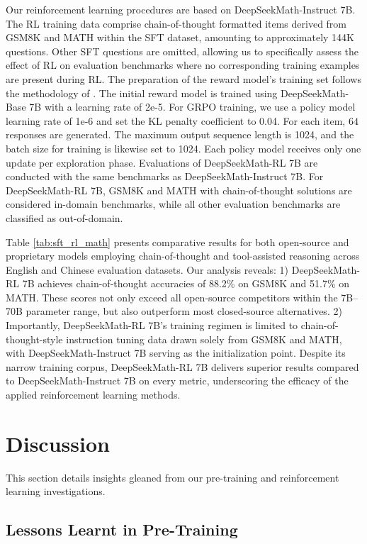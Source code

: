 Our reinforcement learning procedures are based on DeepSeekMath-Instruct 7B. The RL training data comprise chain-of-thought formatted items derived from GSM8K and MATH within the SFT dataset, amounting to approximately 144K questions. Other SFT questions are omitted, allowing us to specifically assess the effect of RL on evaluation benchmarks where no corresponding training examples are present during RL. The preparation of the reward model’s training set follows the methodology of \citep{wang2023math}. The initial reward model is trained using DeepSeekMath-Base 7B with a learning rate of 2e-5. For GRPO training, we use a policy model learning rate of 1e-6 and set the KL penalty coefficient to 0.04. For each item, $64$ responses are generated. The maximum output sequence length is 1024, and the batch size for training is likewise set to 1024. Each policy model receives only one update per exploration phase. Evaluations of DeepSeekMath-RL 7B are conducted with the same benchmarks as DeepSeekMath-Instruct 7B. For DeepSeekMath-RL 7B, GSM8K and MATH with chain-of-thought solutions are considered in-domain benchmarks, while all other evaluation benchmarks are classified as out-of-domain.

Table \ref{tab:sft_rl_math} presents comparative results for both open-source and proprietary models employing chain-of-thought and tool-assisted reasoning across English and Chinese evaluation datasets. Our analysis reveals: 1) DeepSeekMath-RL 7B achieves chain-of-thought accuracies of 88.2\% on GSM8K and 51.7\% on MATH. These scores not only exceed all open-source competitors within the 7B--70B parameter range, but also outperform most closed-source alternatives. 2) Importantly, DeepSeekMath-RL 7B's training regimen is limited to chain-of-thought-style instruction tuning data drawn solely from GSM8K and MATH, with DeepSeekMath-Instruct 7B serving as the initialization point. Despite its narrow training corpus, DeepSeekMath-RL 7B delivers superior results compared to DeepSeekMath-Instruct 7B on every metric, underscoring the efficacy of the applied reinforcement learning methods.

\section{Discussion}
This section details insights gleaned from our pre-training and reinforcement learning investigations.

\subsection{Lessons Learnt in Pre-Training}

